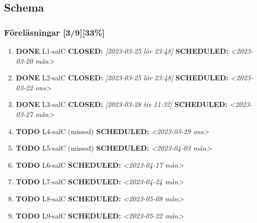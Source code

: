 \documentclass[11pt]{article}
\begin{document}
\subsection{Schema}
\label{sec:org4eabb9f}
\subsubsection{Föreläsningar [3/9][33\%]}
\label{sec:org224dfed}
\begin{enumerate}
\item {\bfseries\sffamily DONE} L1-salC
\label{sec:org7f9bbd7}
\noindent\textbf{CLOSED:} \textit{[2023-03-25 lör 23:48] } \textbf{SCHEDULED:} \textit{<2023-03-20 mån>}\\[0pt]
\item {\bfseries\sffamily DONE} L2-salC
\label{sec:orgfd3ccff}
\noindent\textbf{CLOSED:} \textit{[2023-03-25 lör 23:48] } \textbf{SCHEDULED:} \textit{<2023-03-22 ons>}\\[0pt]
\item {\bfseries\sffamily DONE} L3-salC
\label{sec:org07855f9}
\noindent\textbf{CLOSED:} \textit{[2023-03-28 tis 11:32] } \textbf{SCHEDULED:} \textit{<2023-03-27 mån>}\\[0pt]
\item {\bfseries\sffamily TODO} L4-salC (missed)
\label{sec:orgb9e2da9}
\noindent\textbf{SCHEDULED:} \textit{<2023-03-29 ons>}\\[0pt]
\item {\bfseries\sffamily TODO} L5-salC (missed)
\label{sec:orgcb16c73}
\noindent\textbf{SCHEDULED:} \textit{<2023-04-03 mån>}\\[0pt]
\item {\bfseries\sffamily TODO} L6-salC
\label{sec:org2a968cc}
\noindent\textbf{SCHEDULED:} \textit{<2023-04-17 mån>}\\[0pt]
\item {\bfseries\sffamily TODO} L7-salC
\label{sec:org8b7c807}
\noindent\textbf{SCHEDULED:} \textit{<2023-04-24 mån>}\\[0pt]
\item {\bfseries\sffamily TODO} L8-salC
\label{sec:org0de982c}
\noindent\textbf{SCHEDULED:} \textit{<2023-05-08 mån>}\\[0pt]
\item {\bfseries\sffamily TODO} L9-salC
\label{sec:orgb25a910}
\noindent\textbf{SCHEDULED:} \textit{<2023-05-22 mån>}\\[0pt]
\end{enumerate}
\end{document}

